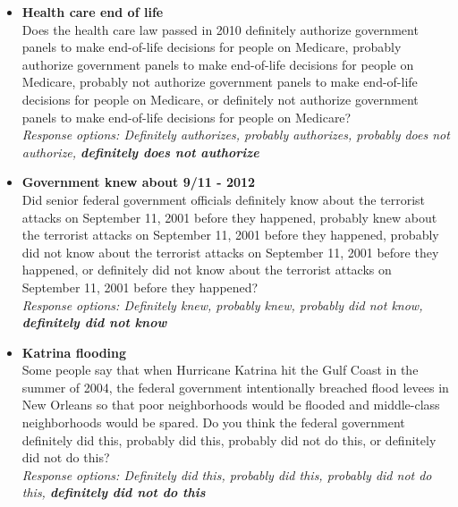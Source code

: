 \documentclass[12pt, letterpaper]{article}
\begin{document}
\normalsize
\begin{itemize}
\item \textbf{Health care end of life} \\
Does the health care law passed in 2010 definitely authorize government panels to make end-of-life decisions for people on Medicare, probably authorize government panels to make end-of-life decisions for people on Medicare, probably not authorize government panels to make end-of-life decisions for people on Medicare, or definitely not authorize government panels to make end-of-life decisions for people on Medicare?  \\     
\textit{Response options: Definitely authorizes, probably authorizes, probably does not authorize, \textbf{definitely does not authorize}} \\
\end{itemize}

\normalsize
\begin{itemize}
\item \textbf{Government knew about 9/11 - 2012} \\
Did senior federal government officials definitely know about the terrorist attacks on September 11, 2001 before they happened, probably knew about the terrorist attacks on September 11, 2001 before they happened, probably did not know about the terrorist attacks on September 11, 2001 before they happened, or definitely did not know about the terrorist attacks on September 11, 2001 before they happened?  \\     
\textit{Response options: Definitely knew, probably knew, probably did not know, \textbf{definitely did not know}} \\
\end{itemize}

\normalsize
\begin{itemize}
\item \textbf{Katrina flooding} \\
Some people say that when Hurricane Katrina hit the Gulf Coast in the summer of 2004, the federal government intentionally breached flood levees in New Orleans so that poor neighborhoods would be flooded and middle-class neighborhoods would be spared. Do you think the federal government definitely did this, probably did this, probably did not do this, or definitely did not do this?  \\     
\textit{Response options: Definitely did this, probably did this, probably did not do this, \textbf{definitely did not do this}} \\
\end{itemize}
\end{document}
